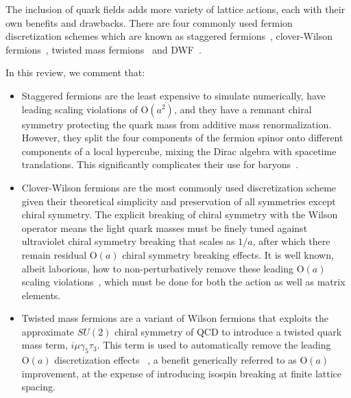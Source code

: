 \documentclass{ar-1col}
\def\g{\gamma}
\begin{document}
The inclusion of quark fields adds more variety of lattice actions, each with their own benefits and drawbacks.
There are four commonly used fermion discretization schemes which are known as staggered fermions~\cite{Kogut:1974ag,Banks:1975gq,Banks:1976ia,Susskind:1976jm}, clover-Wilson fermions~\cite{Sheikholeslami:1985ij}, twisted mass fermions~\cite{Frezzotti:2000nk} and DWF~\cite{Kaplan:1992bt,Shamir:1993zy,Furman:1994ky}.%
\begin{marginnote}
\end{marginnote}%
In this review, we comment that:
\begin{itemize}[leftmargin=*]
\item Staggered fermions are the least expensive to simulate numerically, have leading scaling violations of $\mathrm{O}(a^2)$, and they have a remnant chiral symmetry protecting the quark mass from additive mass renormalization.  However, they split the four components of the fermion spinor onto different components of a local hypercube, mixing the Dirac algebra with spacetime translations.  This significantly complicates their use for baryons~\cite{Golterman:1984dn,Bailey:2006zn,Lin:2019pia}.

\item Clover-Wilson fermions are the most commonly used discretization scheme given their theoretical simplicity and preservation of all symmetries except chiral symmetry.  The explicit breaking of chiral symmetry with the Wilson operator means the light quark masses must be finely tuned against ultraviolet chiral symmetry breaking that scales as $1/a$, after which there remain residual $\mathrm{O}(a)$ chiral symmetry breaking effects.  It is well known, albeit laborious, how to non-perturbatively remove these leading $\mathrm{O}(a)$ scaling violations~\cite{Luscher:1996sc,Luscher:1996ug,Luscher:1996jn,Capitani:1998mq}, which must be done for both the action as well as matrix elements.

\item Twisted mass fermions are a variant of Wilson fermions that exploits the approximate $SU(2)$ chiral symmetry of QCD to introduce a twisted quark mass term, $i\mu\g_5 \tau_3$.
This term is used to automatically remove the leading $\mathrm{O}(a)$ discretization effects~\cite{Frezzotti:2003ni}%
 , a benefit generically referred to as $\mathrm{O}(a)$ improvement,
 at the expense of introducing isospin breaking at finite lattice spacing.


\end{itemize}
\end{document}
